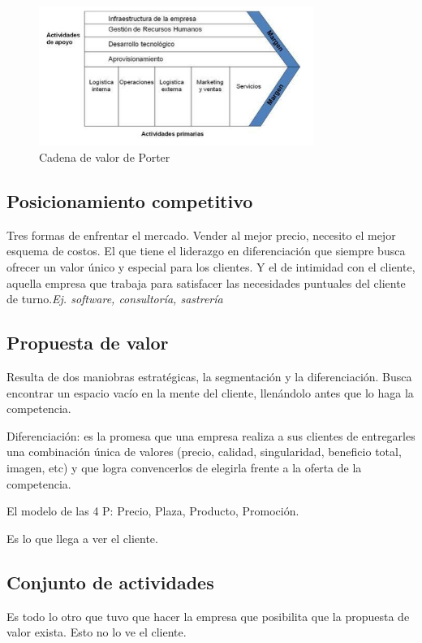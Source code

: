 \documentclass[titlepage,a4paper]{article}
\begin{document}
\begin{figure}[!htb]
    \centering
    \includegraphics[width=0.8\textwidth]{imagenes/CadenaDeValor.PNG}
    \caption{Cadena de valor de Porter}
\end{figure}


\subsection{Posicionamiento competitivo}
Tres formas de enfrentar el mercado. Vender al mejor precio, necesito el mejor esquema de costos. El que tiene el liderazgo en diferenciación que siempre busca ofrecer un valor único y especial para los clientes. Y el de intimidad con el cliente, aquella empresa que trabaja para satisfacer las necesidades puntuales del cliente de turno.\textit{Ej. software, consultoría, sastrería}


\subsection{Propuesta de valor}

Resulta de dos maniobras estratégicas, la segmentación y la diferenciación. Busca encontrar un espacio vacío en la mente del cliente, llenándolo antes que lo haga la competencia.

Diferenciación: es la promesa que una empresa realiza a sus clientes de entregarles una combinación única de valores (precio, calidad, singularidad, beneficio total, imagen, etc) y que logra convencerlos de elegirla frente a la oferta de la competencia.

El modelo de las 4 P: Precio, Plaza, Producto, Promoción.

Es lo que llega a ver el cliente.

\subsection{Conjunto de actividades}
Es todo lo otro que tuvo que hacer la empresa que posibilita que la propuesta de valor exista. Esto no lo ve el cliente.
\end{document}
